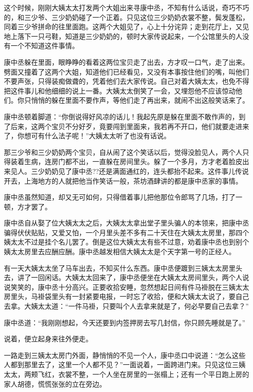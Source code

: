 \documentclass[12pt,UTF8]{ctexbook}
\begin{document}
{{{这个时候，刚刚大姨太太打发两个大姐出来寻康中丞，不知有什么话说，奇巧不巧的，和三少爷、三少奶奶碰了一个正着。只见这位三少奶奶衣裳不整，鬓发蓬松，同着三少爷拼命的往里面跑。这两个大姐见了，心上十分诧异；走到花厅上，又见地上落下一只弓鞋，知道是三少奶奶的，顿时大家传说起来，一个公馆里头的人没有一个不知道这件事情。

康中丞躲在里面，眼睁睁的看着这两位宝贝走了出去，方才叹一口气，走了出来。劈面又撞着了这两个大姐，知道他们已经看见，又没有本事按住他们的嘴，叫他们不要声张，只得装痴做聋的，凭着他们去大家传说。自己对着大姨太太，也免不得把这件事儿和他细细的说上一番。大姨太太倒笑了一会，又埋怨他不应该惊动他们。你只悄悄的躲在里面不要作声，等他们走了再出来，就闹不出这般笑话来了。

康中丞顿着脚道：“你倒说得好风凉的话儿！我起先原是躲在里面不敢作声的，到了后来，这两个宝贝不分好歹，竟要闯到里面来，我若再不开口，他们就要走进来了，你想可有什么法子呢！”大姨太太听了也没有话说。

那三少爷和三少奶奶两个宝贝，自从闹了这个笑话以后，觉得没脸见人，两个人只得装着生病，连房门都不出，一直躲在房间里头。躲了一个多月，方才老着脸皮出来见人。三少奶奶见了康中丞??还是满面通红的，连头都抬不起来。这件事儿传说开去，上海地方的人就把他当作笑话一般，茶坊酒肆讲的都是康中丞家的事情。

康中丞虽然知道，却又无可如何，只得借着事儿把他那位令郎骂了几场，打了一顿，方才罢了。

康中丞自从娶了位大姨太太之后，大姨太太拿出堂子里头骗人的本领来，把康中丞骗得伏伏贴贴，又爱又怕，一个月里头差不多有二十天住在大姨太太房里，那四个姨太太不过是挂个名儿罢了。倒是这位大姨太太有些不过意，劝着康中丞也到别个姨太太房里去应酬应酬。康中丞越发相信大姨太太是个天字第一号的正经人。

有一天大姨太太坐了马车出去，不知买什么东西。康中丞便踱到三姨太太房里头去，讲了一回闲话。大姨太太回来了，康中丞便坐在大姨太太房间里头，两个人说说笑笑的，康中丞十分高兴。正要收拾安睡，忽然想起日间有件马褂脱在三姨太太房里头，马褂袋里头有一封紧要电报，一时忘了收拾，便和大姨太太说了，要自己去拿。大姨太太道：“一件马褂，只要叫个人去拿来就是了，何必早要自己去拿？”

康中丞道：“我刚刚想起，今天还要到内签押房去写几封信，你只顾先睡就是了。”

说着，便立起身来往外便走。

一路走到三姨太太房门外面，静悄悄的不见一个人，康中丞口中说道：“怎么这些人都到那里去了，这里一个人都不见？”一面说着，一面跨进门来。只见这位三姨太太，两颊飞红，衣裳不整，一个人坐在房里的一张榻上；还有一个平日跑上房的家人胡德，慌慌张张的立在旁边。

}}}
\end{document}
